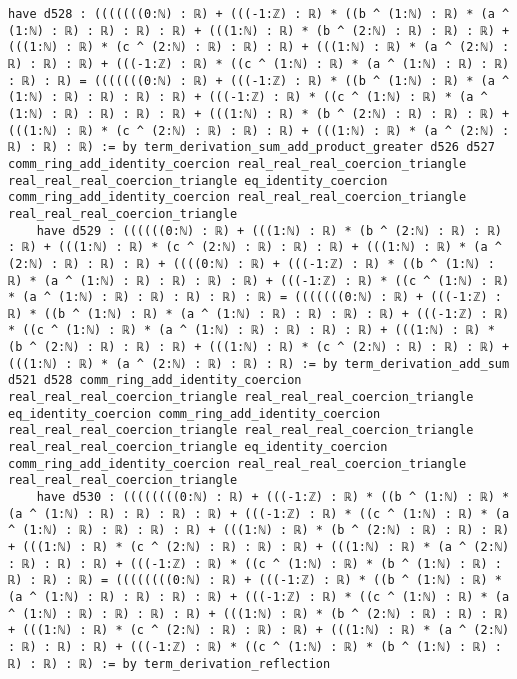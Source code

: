 \documentclass{article}
\begin{document}
\begin{tcolorbox}[colback=white!10, width=\linewidth]
\begin{lstlisting}[language=Lean4]
    have d528 : (((((((0:ℕ) : ℝ) + (((-1:ℤ) : ℝ) * ((b ^ (1:ℕ) : ℝ) * (a ^ (1:ℕ) : ℝ) : ℝ) : ℝ) : ℝ) + (((1:ℕ) : ℝ) * (b ^ (2:ℕ) : ℝ) : ℝ) : ℝ) + (((1:ℕ) : ℝ) * (c ^ (2:ℕ) : ℝ) : ℝ) : ℝ) + (((1:ℕ) : ℝ) * (a ^ (2:ℕ) : ℝ) : ℝ) : ℝ) + (((-1:ℤ) : ℝ) * ((c ^ (1:ℕ) : ℝ) * (a ^ (1:ℕ) : ℝ) : ℝ) : ℝ) : ℝ) = (((((((0:ℕ) : ℝ) + (((-1:ℤ) : ℝ) * ((b ^ (1:ℕ) : ℝ) * (a ^ (1:ℕ) : ℝ) : ℝ) : ℝ) : ℝ) + (((-1:ℤ) : ℝ) * ((c ^ (1:ℕ) : ℝ) * (a ^ (1:ℕ) : ℝ) : ℝ) : ℝ) : ℝ) + (((1:ℕ) : ℝ) * (b ^ (2:ℕ) : ℝ) : ℝ) : ℝ) + (((1:ℕ) : ℝ) * (c ^ (2:ℕ) : ℝ) : ℝ) : ℝ) + (((1:ℕ) : ℝ) * (a ^ (2:ℕ) : ℝ) : ℝ) : ℝ) := by term_derivation_sum_add_product_greater d526 d527 comm_ring_add_identity_coercion real_real_real_coercion_triangle real_real_real_coercion_triangle eq_identity_coercion comm_ring_add_identity_coercion real_real_real_coercion_triangle real_real_real_coercion_triangle
    have d529 : ((((((0:ℕ) : ℝ) + (((1:ℕ) : ℝ) * (b ^ (2:ℕ) : ℝ) : ℝ) : ℝ) + (((1:ℕ) : ℝ) * (c ^ (2:ℕ) : ℝ) : ℝ) : ℝ) + (((1:ℕ) : ℝ) * (a ^ (2:ℕ) : ℝ) : ℝ) : ℝ) + ((((0:ℕ) : ℝ) + (((-1:ℤ) : ℝ) * ((b ^ (1:ℕ) : ℝ) * (a ^ (1:ℕ) : ℝ) : ℝ) : ℝ) : ℝ) + (((-1:ℤ) : ℝ) * ((c ^ (1:ℕ) : ℝ) * (a ^ (1:ℕ) : ℝ) : ℝ) : ℝ) : ℝ) : ℝ) = (((((((0:ℕ) : ℝ) + (((-1:ℤ) : ℝ) * ((b ^ (1:ℕ) : ℝ) * (a ^ (1:ℕ) : ℝ) : ℝ) : ℝ) : ℝ) + (((-1:ℤ) : ℝ) * ((c ^ (1:ℕ) : ℝ) * (a ^ (1:ℕ) : ℝ) : ℝ) : ℝ) : ℝ) + (((1:ℕ) : ℝ) * (b ^ (2:ℕ) : ℝ) : ℝ) : ℝ) + (((1:ℕ) : ℝ) * (c ^ (2:ℕ) : ℝ) : ℝ) : ℝ) + (((1:ℕ) : ℝ) * (a ^ (2:ℕ) : ℝ) : ℝ) : ℝ) := by term_derivation_add_sum d521 d528 comm_ring_add_identity_coercion real_real_real_coercion_triangle real_real_real_coercion_triangle eq_identity_coercion comm_ring_add_identity_coercion real_real_real_coercion_triangle real_real_real_coercion_triangle real_real_real_coercion_triangle eq_identity_coercion comm_ring_add_identity_coercion real_real_real_coercion_triangle real_real_real_coercion_triangle
    have d530 : ((((((((0:ℕ) : ℝ) + (((-1:ℤ) : ℝ) * ((b ^ (1:ℕ) : ℝ) * (a ^ (1:ℕ) : ℝ) : ℝ) : ℝ) : ℝ) + (((-1:ℤ) : ℝ) * ((c ^ (1:ℕ) : ℝ) * (a ^ (1:ℕ) : ℝ) : ℝ) : ℝ) : ℝ) + (((1:ℕ) : ℝ) * (b ^ (2:ℕ) : ℝ) : ℝ) : ℝ) + (((1:ℕ) : ℝ) * (c ^ (2:ℕ) : ℝ) : ℝ) : ℝ) + (((1:ℕ) : ℝ) * (a ^ (2:ℕ) : ℝ) : ℝ) : ℝ) + (((-1:ℤ) : ℝ) * ((c ^ (1:ℕ) : ℝ) * (b ^ (1:ℕ) : ℝ) : ℝ) : ℝ) : ℝ) = ((((((((0:ℕ) : ℝ) + (((-1:ℤ) : ℝ) * ((b ^ (1:ℕ) : ℝ) * (a ^ (1:ℕ) : ℝ) : ℝ) : ℝ) : ℝ) + (((-1:ℤ) : ℝ) * ((c ^ (1:ℕ) : ℝ) * (a ^ (1:ℕ) : ℝ) : ℝ) : ℝ) : ℝ) + (((1:ℕ) : ℝ) * (b ^ (2:ℕ) : ℝ) : ℝ) : ℝ) + (((1:ℕ) : ℝ) * (c ^ (2:ℕ) : ℝ) : ℝ) : ℝ) + (((1:ℕ) : ℝ) * (a ^ (2:ℕ) : ℝ) : ℝ) : ℝ) + (((-1:ℤ) : ℝ) * ((c ^ (1:ℕ) : ℝ) * (b ^ (1:ℕ) : ℝ) : ℝ) : ℝ) : ℝ) := by term_derivation_reflection

\end{lstlisting}
\end{tcolorbox}
\end{document}
